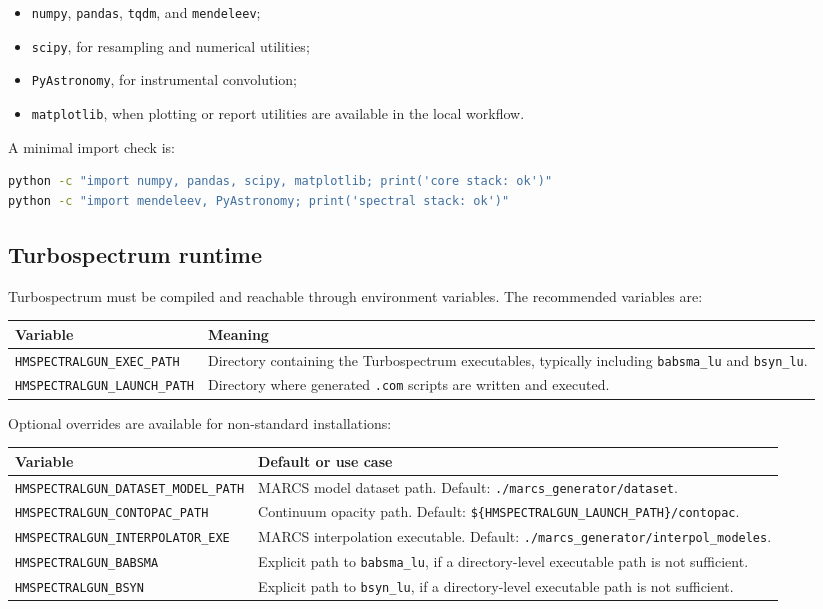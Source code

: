 \documentclass[11pt,a4paper]{article}
\newcommand{\code}[1]{\texttt{#1}}
\begin{document}
\begin{itemize}
  \item \code{numpy}, \code{pandas}, \code{tqdm}, and \code{mendeleev};
  \item \code{scipy}, for resampling and numerical utilities;
  \item \code{PyAstronomy}, for instrumental convolution;
  \item \code{matplotlib}, when plotting or report utilities are available in the local workflow.
\end{itemize}

A minimal import check is:

\begin{lstlisting}[language=bash]
python -c "import numpy, pandas, scipy, matplotlib; print('core stack: ok')"
python -c "import mendeleev, PyAstronomy; print('spectral stack: ok')"
\end{lstlisting}

\subsection{Turbospectrum runtime}

Turbospectrum must be compiled and reachable through environment variables. The recommended variables are:

\begin{longtable}{p{}p{}}
\toprule
\textbf{Variable} & \textbf{Meaning} \\
\midrule
\code{HMSPECTRALGUN\_EXEC\_PATH} & Directory containing the Turbospectrum executables, typically including \code{babsma\_lu} and \code{bsyn\_lu}. \\
\code{HMSPECTRALGUN\_LAUNCH\_PATH} & Directory where generated \code{.com} scripts are written and executed. \\
\bottomrule
\end{longtable}

Optional overrides are available for non-standard installations:

\begin{longtable}{p{}p{}}
\toprule
\textbf{Variable} & \textbf{Default or use case} \\
\midrule
\code{HMSPECTRALGUN\_DATASET\_MODEL\_PATH} & MARCS model dataset path. Default: \code{./marcs\_generator/dataset}. \\
\code{HMSPECTRALGUN\_CONTOPAC\_PATH} & Continuum opacity path. Default: \code{\$\{HMSPECTRALGUN\_LAUNCH\_PATH\}/contopac}. \\
\code{HMSPECTRALGUN\_INTERPOLATOR\_EXE} & MARCS interpolation executable. Default: \code{./marcs\_generator/interpol\_modeles}. \\
\code{HMSPECTRALGUN\_BABSMA} & Explicit path to \code{babsma\_lu}, if a directory-level executable path is not sufficient. \\
\code{HMSPECTRALGUN\_BSYN} & Explicit path to \code{bsyn\_lu}, if a directory-level executable path is not sufficient. \\
\bottomrule
\end{longtable}
\end{document}

